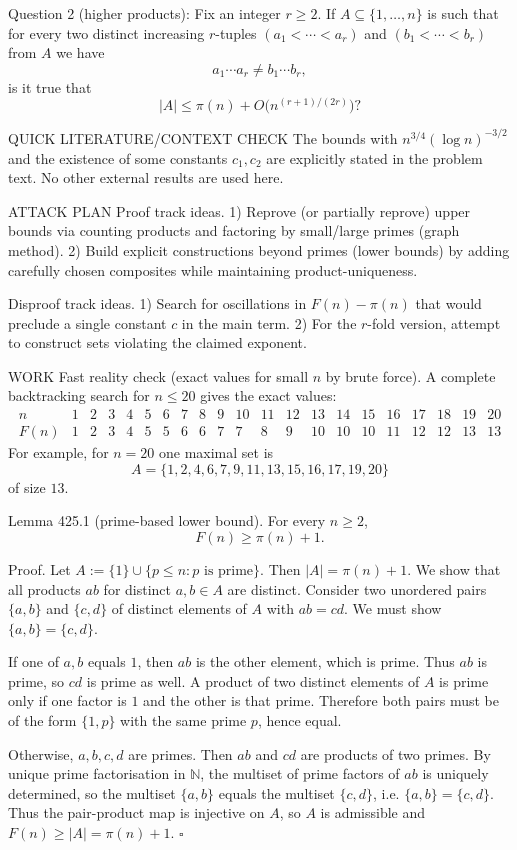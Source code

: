 Question 2 (higher products): Fix an integer $r\ge 2$. If $A\subseteq\{1,\dots,n\}$ is such that for every two distinct increasing $r$-tuples $(a_1<\cdots<a_r)$ and $(b_1<\cdots<b_r)$ from $A$ we have
\[
 a_1\cdots a_r\ne b_1\cdots b_r,
\]
is it true that
\[
|A|\le \pi(n)+O\bigl(n^{(r+1)/(2r)}\bigr)?
\]

QUICK LITERATURE/CONTEXT CHECK
The bounds with $n^{3/4}(\log n)^{-3/2}$ and the existence of some constants $c_1,c_2$ are explicitly stated in the problem text. No other external results are used here.

ATTACK PLAN
Proof track ideas.
1) Reprove (or partially reprove) upper bounds via counting products and factoring by small/large primes (graph method).
2) Build explicit constructions beyond primes (lower bounds) by adding carefully chosen composites while maintaining product-uniqueness.

Disproof track ideas.
1) Search for oscillations in $F(n)-\pi(n)$ that would preclude a single constant $c$ in the main term.
2) For the $r$-fold version, attempt to construct sets violating the claimed exponent.

WORK
Fast reality check (exact values for small $n$ by brute force).
A complete backtracking search for $n\le 20$ gives the exact values:
\[
\begin{array}{c|cccccccccccccccccccc}
 n&1&2&3&4&5&6&7&8&9&10&11&12&13&14&15&16&17&18&19&20\\\hline
 F(n)&1&2&3&4&5&5&6&6&7&7&8&9&10&10&10&11&12&12&13&13
\end{array}
\]
For example, for $n=20$ one maximal set is
\[
A=\{1,2,4,6,7,9,11,13,15,16,17,19,20\}
\]
of size $13$.

Lemma 425.1 (prime-based lower bound).
For every $n\ge 2$,
\[
F(n)\ge \pi(n)+1.
\]

Proof.
Let $A:=\{1\}\cup\{p\le n: p\text{ is prime}\}$. Then $|A|=\pi(n)+1$.
We show that all products $ab$ for distinct $a,b\in A$ are distinct.
Consider two unordered pairs $\{a,b\}$ and $\{c,d\}$ of distinct elements of $A$ with $ab=cd$.
We must show $\{a,b\}=\{c,d\}$.

If one of $a,b$ equals $1$, then $ab$ is the other element, which is prime. Thus $ab$ is prime, so $cd$ is prime as well. A product of two distinct elements of $A$ is prime only if one factor is $1$ and the other is that prime. Therefore both pairs must be of the form $\{1,p\}$ with the same prime $p$, hence equal.

Otherwise, $a,b,c,d$ are primes. Then $ab$ and $cd$ are products of two primes. By unique prime factorisation in $\mathbb N$, the multiset of prime factors of $ab$ is uniquely determined, so the multiset $\{a,b\}$ equals the multiset $\{c,d\}$, i.e. $\{a,b\}=\{c,d\}$.
Thus the pair-product map is injective on $A$, so $A$ is admissible and $F(n)\ge |A|=\pi(n)+1$.
\hfill $\square$

